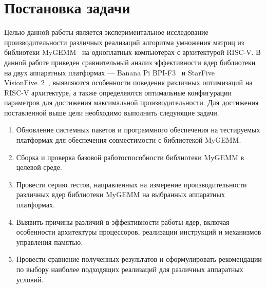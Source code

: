 
\section{Постановка задачи}
\label{sec:task}

Целью данной работы является экспериментальное исследование производительности различных реализаций алгоритма умножения матриц из библиотеки MyGEMM~\cite{mygemm_repo} на одноплатных компьютерах с архитектурой RISC-V. В данной работе приведен сравнительный анализ эффективности ядер библиотеки на двух аппаратных платформах --- Banana Pi BPI-F3~\cite{bananapi_f3_wiki} и StarFive VisionFive~2~\cite{visionfive2_wiki}, выявляются особенности поведения различных оптимизаций на RISC-V архитектуре, а также определяются оптимальные конфигурации параметров для достижения максимальной производительности. Для достижения поставленной выше цели необходимо выполнить следующие задачи.
\begin{enumerate}
    \item Обновление системных пакетов и программного обеспечения на тестируемых платформах для обеспечения совместимости с библиотекой MyGEMM.
    \item Сборка и проверка базовой работоспособности библиотеки MyGEMM в целевой среде.
    \item Провести серию тестов, направленных на измерение производительности различных ядер библиотеки MyGEMM на выбранных аппаратных платформах.
    \item Выявить причины различий в эффективности работы ядер, включая особенности архитектуры процессоров, реализации инструкций и механизмов управления памятью.
    \item Провести сравнение полученных результатов и сформулировать рекомендации по выбору наиболее подходящих реализаций для различных аппаратных условий.
\end{enumerate}